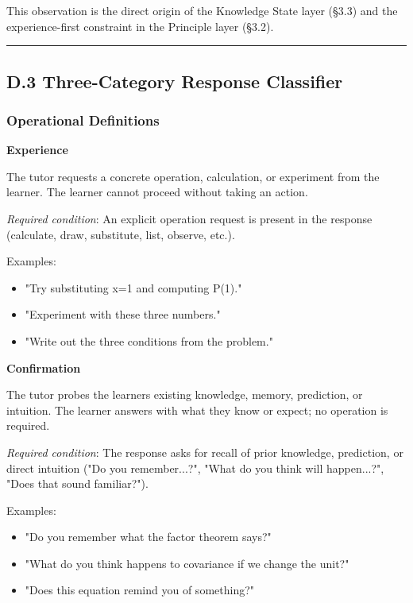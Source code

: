 \documentclass[
]{article}
\providecommand{\tightlist}{%
  \setlength{\itemsep}{0pt}\setlength{\parskip}{0pt}}
\begin{document}
This observation is the direct origin of the Knowledge State layer (§3.3) and the experience-first constraint in the Principle layer (§3.2).

\begin{center}\rule{0.5\linewidth}{0.5pt}\end{center}

\subsection{D.3 Three-Category Response Classifier}\label{d3-three-category-response-classifier}

\subsubsection{Operational Definitions}\label{operational-definitions}

\textbf{Experience}

The tutor requests a concrete operation, calculation, or experiment from the learner. The learner cannot proceed without taking an action.

\emph{Required condition}: An explicit operation request is present in the response (calculate, draw, substitute, list, observe, etc.).

Examples:

\begin{itemize}
\tightlist
\item
  "Try substituting x=1 and computing P(1)."
\item
  "Experiment with these three numbers."
\item
  "Write out the three conditions from the problem."
\end{itemize}

\textbf{Confirmation}

The tutor probes the learner\textquotesingle s existing knowledge, memory, prediction, or intuition. The learner answers with what they know or expect; no operation is required.

\emph{Required condition}: The response asks for recall of prior knowledge, prediction, or direct intuition ("Do you remember...?", "What do you think will happen...?", "Does that sound familiar?").

Examples:

\begin{itemize}
\tightlist
\item
  "Do you remember what the factor theorem says?"
\item
  "What do you think happens to covariance if we change the unit?"
\item
  "Does this equation remind you of something?"
\end{itemize}
\end{document}
